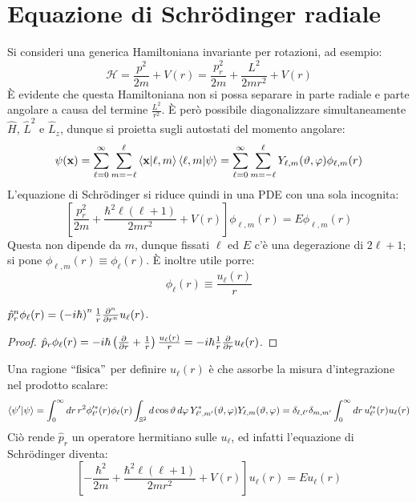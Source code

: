 
\section{Equazione di Schrödinger radiale}

Si consideri una generica Hamiltoniana invariante per rotazioni, ad esempio:
\begin{equation}
	\mathcal{H} = \frac{
	p^2}{2m} + V(r) = \frac{p_r^2}{2m} + \frac{L^2}{2mr^2} + V(r)
	\label{eq:3.1}
\end{equation}
È evidente che questa Hamiltoniana non si possa separare in parte radiale e parte angolare a causa del termine $ \frac{L^2}{r^2} $. È però possibile diagonalizzare simultaneamente $ \hat{H} $, $ \hat{L}^2 $ e $ \hat{L}_z $, dunque si proietta sugli autostati del momento angolare:
\begin{equation}
	\psi(\mathbf{x}) = \sum_{\ell = 0}^{\infty} \sum_{m = -\ell}^{\ell} \braket{\mathbf{x} | \ell,m} \braket{\ell,m | \psi} = \sum_{\ell = 0}^{\infty} \sum_{m = -\ell}^{\ell} Y_{\ell,m}(\vartheta,\varphi) \phi_{\ell,m}(r)
	\label{eq:3.2}
\end{equation}
L'equazione di Schrödinger si riduce quindi in una PDE con una sola incognita:
\begin{equation}
	\left[ \frac{p_r^2}{2m} + \frac{\hbar^2 \ell (\ell + 1)}{2mr^2} + V(r) \right] \phi_{\ell,m}(r) = E \phi_{\ell,m}(r)
	\label{eq:3.3}
\end{equation}
Questa non dipende da $ m $, dunque fissati $ \ell $ ed $ E $ c'è una degerazione di $ 2\ell + 1 $; si pone $ \phi_{\ell,m}(r) \equiv \phi_{\ell}(r) $.
È inoltre utile porre:
\begin{equation}
	\phi_{\ell}(r) \equiv \frac{u_{\ell}(r)}{r}
	\label{eq:3.4}
\end{equation}

\begin{proposition}
	$ \hat{p}_r^n \phi_{\ell}(r) = \left( -i\hbar \right)^n \frac{1}{r} \frac{\partial^n}{\partial r^n} u_{\ell}(r) $.
\end{proposition}
\begin{proof}
	$ \hat{p}_r \phi_{\ell}(r) = -i\hbar \left( \frac{\partial}{\partial r} + \frac{1}{r} \right) \frac{u_{\ell}(r)}{r} = -i\hbar \frac{1}{r} \frac{\partial}{\partial r} u_{\ell}(r) $.
\end{proof}
Una ragione $ ``\text{fisica}" $ per definire $ u_{\ell}(r) $ è che assorbe la misura d'integrazione nel prodotto scalare:
\begin{equation*}
	\braket{\psi' | \psi} = \int_{0}^{\infty} dr \,r^2 \phi'^*_{\ell'}(r) \phi_{\ell}(r) \int_{\mathbb{S}^2} d\cos\vartheta \,d\varphi \, Y^*_{\ell',m'}(\vartheta,\varphi) Y_{\ell,m}(\vartheta,\varphi) = \delta_{\ell,\ell'} \delta_{m,m'} \int_0^{\infty} dr \, u'^*_{\ell'}(r) u_{\ell}(r)
\end{equation*}
Ciò rende $ \hat{p}_r $ un operatore hermitiano sulle $ u_{\ell} $, ed infatti l'equazione di Schrödinger diventa:
\begin{equation}
	\left[ - \frac{\hbar^2}{2m} + \frac{\hbar^2 \ell (\ell + 1)}{2m r^2} + V(r) \right] u_{\ell}(r) = E u_{\ell}(r)
	\label{eq:3.5}
\end{equation}

